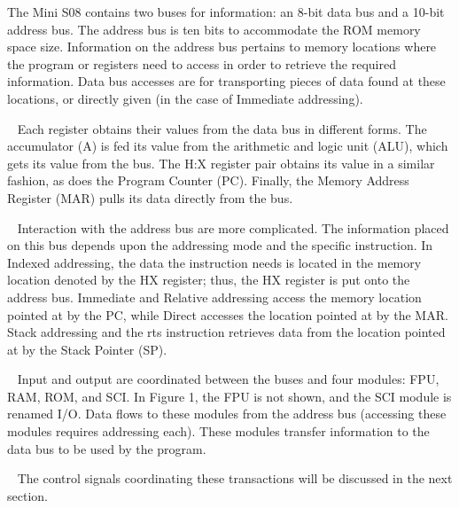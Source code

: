 \documentclass[letterpaper, 12pt]{article}
\begin{document}
\begin{flushleft}
The Mini S08 contains two buses for information: an 8-bit data bus and a 10-bit address bus.  The address bus is ten bits to accommodate the ROM memory space size.  Information on the address bus pertains to memory locations where the program or registers need to access in order to retrieve the required information.  Data bus accesses are for transporting pieces of data found at these locations, or directly given (in the case of Immediate addressing).

~\newline
Each register obtains their values from the data bus in different forms.  The accumulator (A) is fed its value from the arithmetic and logic unit (ALU), which gets its value from the bus.  The H:X register pair obtains its value in a similar fashion, as does the Program Counter (PC).  Finally, the Memory Address Register (MAR) pulls its data directly from the bus.

~\newpage
Interaction with the address bus are more complicated.  The information placed on this bus depends upon the addressing mode and the specific instruction.  In Indexed addressing, the data the instruction needs is located in the memory location denoted by the HX register; thus, the HX register is put onto the address bus.  Immediate and Relative addressing access the memory location pointed at by the PC, while Direct accesses the location pointed at by the MAR. Stack addressing and the rts instruction retrieves data from the location pointed at by the Stack Pointer (SP).

~\newline
Input and output are coordinated between the buses and four modules: FPU, RAM, ROM, and SCI.  In Figure 1, the FPU is not shown, and the SCI module is renamed I/O.  Data flows to these modules from the address bus (accessing these modules requires addressing each).  These modules transfer information to the data bus to be used by the program.

~\newline
The control signals coordinating these transactions will be discussed in the next section.

~\newpage

\end{flushleft}
\end{document}

